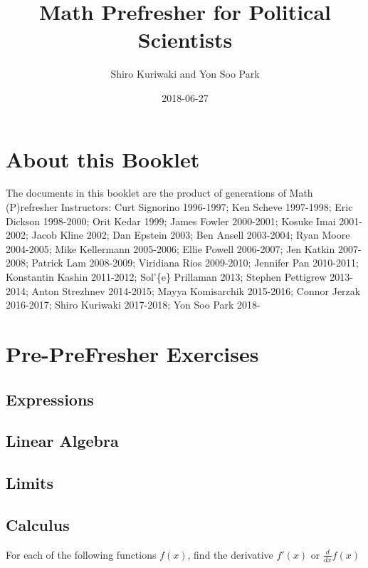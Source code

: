 \documentclass[]{book}
\title{Math Prefresher for Political Scientists}
\author{Shiro Kuriwaki and Yon Soo Park}
\date{2018-06-27}
\theoremstyle{definition}
\theoremstyle{definition}
\theoremstyle{definition}
\theoremstyle{remark}
\begin{document}
\maketitle

{
\setcounter{tocdepth}{1}
\tableofcontents
}
\chapter*{About this Booklet}\label{about-this-booklet}

The documents in this booklet are the product of generations of Math
(P)refresher Instructors: Curt Signorino 1996-1997; Ken Scheve
1997-1998; Eric Dickson 1998-2000; Orit Kedar 1999; James Fowler
2000-2001; Kosuke Imai 2001-2002; Jacob Kline 2002; Dan Epstein 2003;
Ben Ansell 2003-2004; Ryan Moore 2004-2005; Mike Kellermann 2005-2006;
Ellie Powell 2006-2007; Jen Katkin 2007-2008; Patrick Lam 2008-2009;
Viridiana Rios 2009-2010; Jennifer Pan 2010-2011; Konstantin Kashin
2011-2012; Sol'\{e\} Prillaman 2013; Stephen Pettigrew 2013-2014; Anton
Strezhnev 2014-2015; Mayya Komisarchik 2015-2016; Connor Jerzak
2016-2017; Shiro Kuriwaki 2017-2018; Yon Soo Park 2018-

\chapter{Pre-PreFresher Exercises}\label{pre-prefresher-exercises}

\section{Expressions}\label{expressions}

\section{Linear Algebra}\label{linear-algebra}

\section{Limits}\label{limits}

\section{Calculus}\label{calculus}

For each of the following functions \(f(x)\), find the derivative
\(f'(x)\) or \(\frac{d}{dx}f(x)\)
\end{document}
